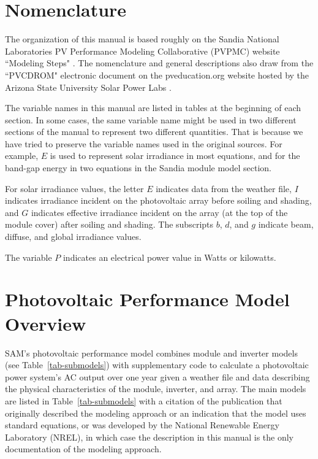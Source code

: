 \documentclass[12pt,letterpaper]{article}
\begin{document}
\mainmatter
\tableofcontents
\listoffigures
\listoftables

\chapter{Nomenclature}

The organization of this manual is based roughly on the Sandia National Laboratories PV Performance Modeling Collaborative (PVPMC) website ``Modeling Steps" \citep{pvpmc}. The nomenclature and general descriptions also draw from the ``PVCDROM" electronic document on the pveducation.org website hosted by the Arizona State University Solar Power Labs \citep{pvcdrom}.

The variable names in this manual are listed in tables at the beginning of each section. In some cases, the same variable name might be used in two different sections of the manual to represent two different quantities. That is because we have tried to preserve the variable names used in the original sources. For example, $E$ is used to represent solar irradiance in most equations, and for the band-gap energy in two equations in the Sandia module model section.

For solar irradiance values, the letter $E$ indicates data from the weather file, $I$ indicates irradiance incident on the photovoltaic array before soiling and shading, and $G$ indicates effective irradiance incident on the array (at the top of the module cover) after soiling and shading. The subscripts $b$, $d$, and $g$ indicate beam, diffuse, and global irradiance values.

The variable $P$ indicates an electrical power value in Watts or kilowatts.

\chapter{Photovoltaic Performance Model Overview}

SAM's photovoltaic performance model combines module and inverter models (see Table~\ref{tab-submodels}) with supplementary code to calculate a photovoltaic power system's AC output over one year given a weather file and data describing the physical characteristics of the module, inverter, and array. The main models are listed in Table~\ref{tab-submodels} with a citation of the publication that originally described the modeling approach or an indication that the model uses standard equations, or was developed by the National Renewable Energy Laboratory (NREL), in which case the description in this manual is the only documentation of the modeling approach.
\end{document}
